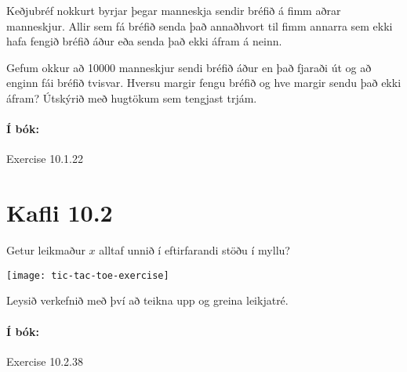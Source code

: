 \documentclass{exam}
\begin{document}
\begin{questions}
\question Keðjubréf nokkurt byrjar þegar manneskja sendir bréfið á fimm aðrar manneskjur. Allir sem fá bréfið senda það annaðhvort til fimm annarra sem ekki hafa fengið bréfið áður eða senda það ekki áfram á neinn.

Gefum okkur að 10000 manneskjur sendi bréfið áður en það fjaraði út og að enginn fái bréfið tvisvar. Hversu margir fengu bréfið og hve margir sendu það ekki áfram? Útskýrið með hugtökum sem tengjast trjám.

\paragraph{Í bók:} Exercise 10.1.22

\section{Kafli 10.2}

\question Getur leikmaður $x$ alltaf unnið í eftirfarandi stöðu í myllu?

\begin{center}
\texttt{[image: tic-tac-toe-exercise]}
\end{center}

Leysið verkefnið með því að teikna upp og greina leikjatré.

\paragraph{Í bók:} Exercise 10.2.38

\end{questions}
\end{document}
